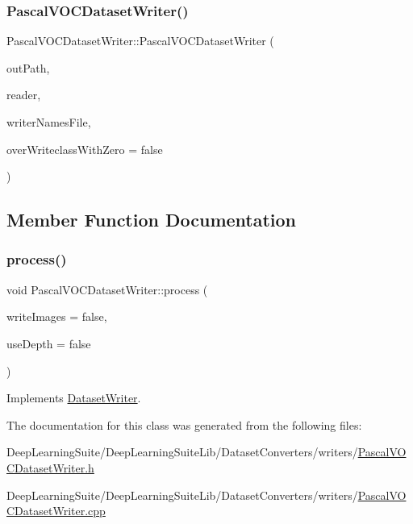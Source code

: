 \subsubsection{\texorpdfstring{Pascal\+V\+O\+C\+Dataset\+Writer()}{PascalVOCDatasetWriter()}}
{\footnotesize\ttfamily Pascal\+V\+O\+C\+Dataset\+Writer\+::\+Pascal\+V\+O\+C\+Dataset\+Writer (\begin{DoxyParamCaption}\item[{const std\+::string \&}]{out\+Path,  }\item[{\hyperlink{_dataset_reader_8h_a30d89cba514a220d64d04535c0465f1c}{Dataset\+Reader\+Ptr} \&}]{reader,  }\item[{const std\+::string \&}]{writer\+Names\+File,  }\item[{bool}]{over\+Writeclass\+With\+Zero = {\ttfamily false} }\end{DoxyParamCaption})}



\subsection{Member Function Documentation}
\mbox{\label{class_pascal_v_o_c_dataset_writer_a93b4aa44b217491ddf99348b2517e6ea}} 
\subsubsection{\texorpdfstring{process()}{process()}}
{\footnotesize\ttfamily void Pascal\+V\+O\+C\+Dataset\+Writer\+::process (\begin{DoxyParamCaption}\item[{bool}]{write\+Images = {\ttfamily false},  }\item[{bool}]{use\+Depth = {\ttfamily false} }\end{DoxyParamCaption})\hspace{0.3cm}{\ttfamily [virtual]}}



Implements \hyperlink{class_dataset_writer_a97270b2e182e6c08d9342d8db42710fd}{Dataset\+Writer}.



The documentation for this class was generated from the following files\+:\begin{DoxyCompactItemize}
\item 
Deep\+Learning\+Suite/\+Deep\+Learning\+Suite\+Lib/\+Dataset\+Converters/writers/\hyperlink{_pascal_v_o_c_dataset_writer_8h}{Pascal\+V\+O\+C\+Dataset\+Writer.\+h}\item 
Deep\+Learning\+Suite/\+Deep\+Learning\+Suite\+Lib/\+Dataset\+Converters/writers/\hyperlink{_pascal_v_o_c_dataset_writer_8cpp}{Pascal\+V\+O\+C\+Dataset\+Writer.\+cpp}\end{DoxyCompactItemize}

